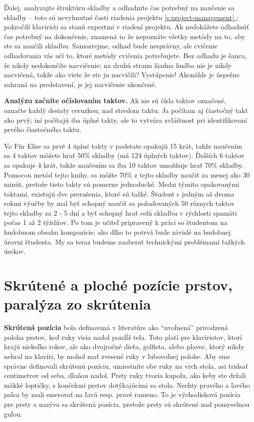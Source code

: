 \documentclass[11pt,a4paper]{book}
\newcommand*{\fullref}[1]{\hyperref[{#1}]{\ref*{#1} \nameref*{#1}}} %
\begin{document}
Ďalej, analyzujte štruktúru skladby a odhadnite čas potrebný na naučenie sa skladby – toto sú nevyhnutné časti riadenia projektu \fullref{s:project-management}; pokročilí klaviristi sa stanú expertmi v riadení projektu. Ak nedokážete odhadnúť čas potrebný na dokončenie, znamená to že nepoznáte všetky metódy na to, aby ste sa naučili skladbu. Samozrejme, odhad bude nesprávny, ale cvičenie odhadovania vás učí to, ktoré metódy cvičenia potrebujete. Bez odhadu je šanca, že nikdy nedokončíte nacvičenie; na druhú stranu žiadna hudba nie je nikdy nacvičená, takže ako viete že ste ju nacvičili? Vystúpenie! Akonáhle je úspešne zahraná na predstavení, je jej nacvičenie ukončené.

\textbf{Analýzu začnite očíslovaním taktov.} Ak nie sú čísla taktov označené, označte každý desiaty ceruzkou, nad stredom taktu. Ja počítam aj čiastočný takt ako prvý; iní počítajú iba úplné takty, ale to vytvára zvláštnosť pri identifikovaní prvého čiastočného taktu. 

Vo Für Elise sa prvé 4 úplné takty v podstate opakujú 15 krát, takže naučením sa 4 taktov môžete hrať 50\% skladby (má 124 úplných taktov). Ďalších 6 taktov sa opakuje 4 krát, takže naučením sa iba 10 taktov umožňuje hrať 70\% skladby. Pomocou metód tejto knihy, sa môžte 70\% z tejto skladby naučiť za menej ako 30 minút, pretože tieto takty sú pomerne jednoduché. Medzi týmito opakovanými taktami, existujú dve prerušenia, ktoré sú ťažké. Študent s jedným až dvoma rokmi výučby by mal byť schopný naučiť sa požadovaných 50 rôznych taktov tejto skladby za 2 - 5 dní a byť schopný hrať celú skladbu v rýchlosti spamäti počas 1 až 2 týždňov. Po tom je učiteľ pripravený k práci so študentom na hudobnom obsahu kompozície; ako dlho to potrvá bude závislé na hudobnej úrovni študenta. My sa teraz budeme zaoberať technickými problémami ťažkých úsekov.

\section{Skrútené a ploché pozície prstov, paralýza zo skrútenia}\label{s:curled-positions}
\textbf{Skrútená pozícia} bola definovaná v literatúre ako “uvoľnená” prirodzená poloha prstov, keď ruky visia nadol pozdĺž tela. Toto platí pre klaviristov, ktorí hrajú niekoľko rokov, ale ako dvojročné dieťa, golfista, alebo plavec, ktorý nikdy nehral na klavíri, by mohol mať zvesené ruky v ľubovoľnej polohe. Aby sme správne definovali skrútenú pozíciu, umiestnite obe ruky na vrch stola, asi tridsať centimetrov od seba, dlaňou nadol. Prsty ruky tvoria kupolu, ako keby ste držali mäkké loptičky, s končekmi prstov dotýkajúcimi sa stola. Nechty pravého a ľavého palca by mali smerovať na ľavú resp. pravé rameno. To je východisková pozícia pre prsty a nazýva sa skrútená pozícia, pretože prsty sú skrútené nad pomyselnou guľou.
\end{document}
